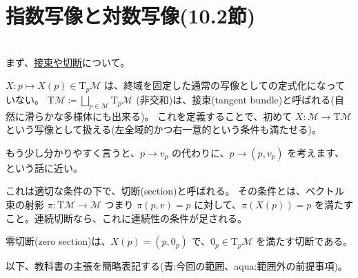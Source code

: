 \documentclass[a4paper,12pt,nomag,dvipdfmx,uplatex]{jsarticle}
\theoremstyle{plain}
\begin{document}
\section{指数写像と対数写像(10.2節)}
\label{sec:exponential-logarithmic}

{\\
    まず、\href{https://ja.wikipedia.org/wiki/\%E3\%83\%99\%E3\%82\%AF\%E3\%83\%88\%E3\%83\%AB\%E6\%9D\%9F}{接束や切断}について。

    $X \colon p \mapsto X(p) \in \mathrm{T}_p \mathcal{M}$ は、終域を固定した通常の写像としての定式化になっていない。
    $\mathrm{T}\mathcal{M} \coloneqq \bigsqcup_{p \in \mathcal{M}} \mathrm{T}_p \mathcal{M}$ (非交和)は、接束(tangent bundle)と呼ばれる(自然に滑らかな多様体にも出来る)。
    これを定義することで、初めて $X \colon \mathcal{M} \to \mathrm{T}\mathcal{M}$ という写像として扱える(左全域的かつ右一意的という条件も満たせる)。

    もう少し分かりやすく言うと、$p \to v_p$ の代わりに、$p \to (p, v_p)$ を考えます、という話に近い。

    これは適切な条件の下で、切断(section)と呼ばれる。
    その条件とは、ベクトル束の射影 $\pi \colon \mathrm{T}\mathcal{M} \to \mathcal{M}$ つまり $\pi(p, v) = p$ に対して、$\pi(X(p)) = p$ を満たすこと。連続切断なら、これに連続性の条件が足される。

    零切断(zero section)は、$X(p) = (p, 0_p)$ で、$0_p \in \mathrm{T}_p\mathcal{M}$ を満たす切断である。
}

以下、教科書の主張を簡略表記する(青:今回の範囲、aqua:範囲外の前提事項)。

\end{document}
